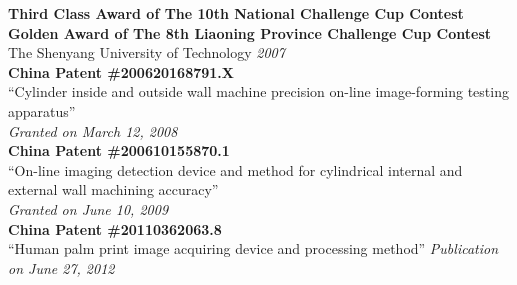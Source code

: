 \documentclass[9pt]{article}
\newenvironment{changemargin}[2]{%
  \begin{list}{}{%
    \setlength{\topsep}{0pt}%
    \setlength{\leftmargin}{#1}%
    \setlength{\rightmargin}{#2}%
    \setlength{\listparindent}{\parindent}%
    \setlength{\itemindent}{\parindent}%
    \setlength{\parsep}{\parskip}%
  }%
  \item[]}{\end{list}
}
\newenvironment{body} {
	\vspace*{-16pt}
	\begin{changemargin}{-0.25in}{-0.5in}
  }	
	{\end{changemargin}
}
\begin{document}
\begin{body}
	\vspace{14pt}
	  \textbf{Third Class Award of The 10th National Challenge Cup Contest\\
    Golden Award of The 8th Liaoning Province Challenge Cup Contest}\\
    The Shenyang University of Technology \hfill{} \emph{2007}\\
	\medskip
    \textbf{China Patent \#200620168791.X}\\
    ``Cylinder inside and outside wall machine precision on-line image-forming testing apparatus''\\
    \hfill{} \emph{Granted on March 12, 2008} \\ 
  \medskip
	  \textbf{China Patent \#200610155870.1}\\
    ``On-line imaging detection device and method for cylindrical internal and external wall machining accuracy''\\
    \hfill{} \emph{Granted on June 10, 2009}\\
	\medskip
    \textbf{China Patent \#20110362063.8}\\
    ``Human palm print image acquiring device and processing method'' \hfill{} \emph{Publication on June 27, 2012}
\end{body}
\end{document}
